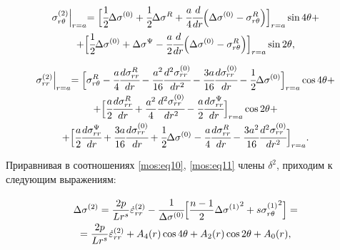 \begin{multline}

\sigma_{r\theta}^{(2)}\Bigl{|}_{r=a}=\Bigl[\cfrac 12 \Delta \sigma^{(0)}+\cfrac 12 \Delta \sigma^{R}+ \cfrac a4 \cfrac {d}{dr}\Bigl(\Delta\sigma^{(0)}-\sigma^{R}_{r\theta} \Bigr) \Bigr]_{r=a}\sin{4\theta}+

\\ \displaystyle

+\Bigl[\cfrac 12 \Delta \sigma^{(0)}+\Delta \sigma^{\Psi}- \cfrac a2 \cfrac {d}{dr}\Bigl(\Delta\sigma^{(0)}-\sigma^{R}_{r\theta} \Bigr) \Bigr]_{r=a}\sin{2\theta},

\end{multline}

\begin{multline}

\sigma_{rr}^{(2)}\Bigl{|}_{r=a}=\Bigl[\sigma^{R}_{r \theta}-\cfrac a4 \cfrac{d \sigma^{R}_{rr}}{dr}-\cfrac{a^2}{16}\cfrac{d^2 \sigma^{(0)}_{rr}}{dr^2}-

\cfrac{3a}{16} \cfrac{d \sigma^{(0)}_{rr}}{dr}- \cfrac 12 \Delta \sigma^{(0)}\Bigr]_{r=a}\cos{4\theta} +\\ \displaystyle

 +\Bigl[\cfrac a2 \cfrac{d \sigma^{R}_{rr}}{dr}+\frac{a^2}{4}\cfrac{d^2 \sigma^{(0)}_{rr}}{dr^2}-

\cfrac{a}{2} \cfrac{d \sigma^{\Psi}_{rr}}{dr}\Bigr]_{r=a}\cos{2\theta}+

\\

+ 

\Bigl[\cfrac a2 \cfrac{d \sigma^{\Psi}_{rr}}{dr}+\cfrac{3a}{16} \cfrac{d \sigma^{(0)}_{rr}}{dr} + \cfrac 12 \Delta\sigma^{(0)} - \cfrac a4 \cfrac{d \sigma^{R}_{rr}}{dr} - \cfrac{3a^2}{16}\cfrac{d^2 \sigma^{(0)}_{rr}}{dr^2}\Bigr]_{r=a}.

\label{mos:eq31}

\end{multline}



Приравнивая в соотношениях \eqref{mos:eq10},  \eqref{mos:eq11} члены $\delta^2$, приходим к следующим выражениям:

\begin{multline}

\label{mos:eq32}

\Delta \sigma^{(2)}=\frac{2p}{Lr^s} \dot{\varepsilon}^{(2)}_{rr}-\cfrac{1}{\Delta \sigma^{(0)}}\Bigl[\frac{n-1}{2}     {\Delta \sigma^{(1)}}^2+s {\sigma^{(1)}_{r\theta}}^2 \Bigr]=\\

=\frac{2p}{Lr^s} \dot{\varepsilon}^{(2)}_{rr}+A_4(r) \cos{4\theta}+A_2(r)\cos{2\theta}+A_0(r),

\end{multline}

